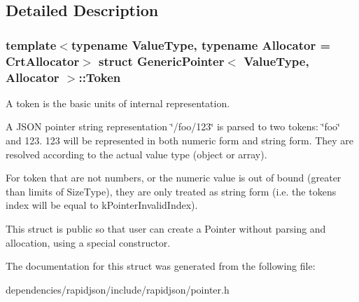 \subsection{Detailed Description}
\subsubsection*{template$<$typename Value\+Type, typename Allocator = Crt\+Allocator$>$\newline
struct Generic\+Pointer$<$ Value\+Type, Allocator $>$\+::\+Token}

A token is the basic units of internal representation. 

A J\+S\+ON pointer string representation \char`\"{}/foo/123\char`\"{} is parsed to two tokens\+: \char`\"{}foo\char`\"{} and 123. 123 will be represented in both numeric form and string form. They are resolved according to the actual value type (object or array).

For token that are not numbers, or the numeric value is out of bound (greater than limits of Size\+Type), they are only treated as string form (i.\+e. the token\textquotesingle{}s index will be equal to k\+Pointer\+Invalid\+Index).

This struct is public so that user can create a Pointer without parsing and allocation, using a special constructor. 

The documentation for this struct was generated from the following file\+:\begin{DoxyCompactItemize}
\item 
dependencies/rapidjson/include/rapidjson/pointer.\+h\end{DoxyCompactItemize}
